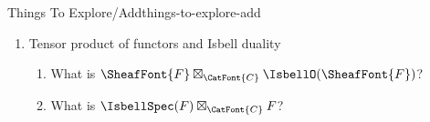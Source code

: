 \begin{remark}{Things To Explore/Add}{things-to-explore-add}
\begin{enumerate}
\begin{enumerate}
                \item Monoidal Isbell duality: monoidality for Isbell adjunction with day convolution (6.3 of coend cofriend)
                \item Isbell duality with sheaves
                \item Isbell duality with Lawvere theories, product preserving functors or whatever
                \item Isbell duality for profunctors
                    \begin{enumerate}
                        \item In view of \cref{properties-of-the-isbell-o-functor-as-a-right-kan-lift-in-prof} of \cref{properties-of-the-isbell-o-functor}, can we just use right Kan lifts/extensions?
                        \item Right Kan lift/extension of Hom functors (there's probably a version of the Yoneda lemma here)
                            \begin{enumerate}
                                \item What is $\Rift_{F}(\Hom_{\CatFont{C}})$
                                \item What is $\Ran_{F}(\Hom_{\CatFont{C}})$
                                \item What is $\Rift_{\Hom_{\CatFont{C}}}(F)$
                                \item What is $\Ran_{\Hom_{\CatFont{C}}}(F)$
                                \item What is $\Lift_{F}(\Hom_{\CatFont{C}})$
                                \item What is $\Lan_{F}(\Hom_{\CatFont{C}})$
                                \item What is $\Lift_{\Hom_{\CatFont{C}}}(F)$
                                \item What is $\Lan_{\Hom_{\CatFont{C}}}(F)$
                            \end{enumerate}
                    \end{enumerate}
            \end{enumerate}
        \item Tensor product of functors and Isbell duality
            \begin{enumerate}
                \item What is $\SheafFont{F}\boxtimes_{\CatFont{C}}\IsbellO(\SheafFont{F})$?
                \item What is $\IsbellSpec(F)\boxtimes_{\CatFont{C}}F$?

\end{enumerate}
\end{enumerate}
\end{remark}
